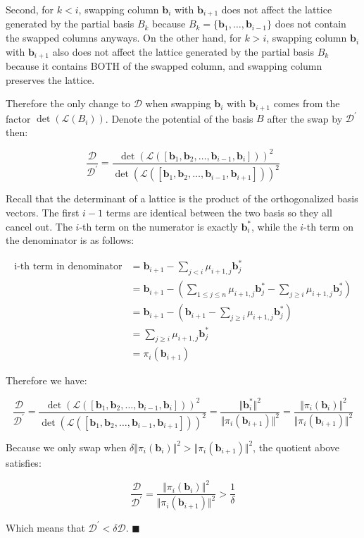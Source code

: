 Second, for $k < i$, swapping column $\mathbf{b}_i$ with $\mathbf{b}_{i+1}$ does not affect the lattice generated by the partial basis $B_k$ because $B_k = \{\mathbf{b}_1, \ldots, \mathbf{b}_{i-1}\}$ does not contain the swapped columns anyways. On the other hand, for $k > i$, swapping column $\mathbf{b}_i$ with $\mathbf{b}_{i+1}$ also does not affect the lattice generated by the partial basis $B_k$ because it contains BOTH of the swapped column, and swapping column preserves the lattice.

Therefore the only change to $\mathcal{D}$ when swapping $\mathbf{b}_i$ with $\mathbf{b}_{i+1}$ comes from the factor $\det(\mathcal{L}(B_i))$. Denote the potential of the basis $B$ after the swap by $\mathcal{D}^\prime$ then:

$$
\frac{\mathcal{D}}{\mathcal{D}^\prime} = \frac{
    \det(\mathcal{L}([\mathbf{b}_1, \mathbf{b}_2, \ldots, \mathbf{b}_{i-1}, \mathbf{b}_{i}]))^2
}{
    \det(\mathcal{L}([\mathbf{b}_1, \mathbf{b}_2, \ldots, \mathbf{b}_{i-1}, \mathbf{b}_{i+1}]))^2
}
$$

Recall that the determinant of a lattice is the product of the orthogonalized basis vectors. The first $i-1$ terms are identical between the two basis so they all cancel out. The $i$-th term on the numerator is exactly $\mathbf{b}_i^\ast$, while the $i$-th term on the denominator is as follows:

$$
\begin{aligned}
\text{i-th term in denominator} &= \mathbf{b}_{i+1} - \sum_{j < i} \mu_{i+1, j}\mathbf{b}_j^\ast \\
&= \mathbf{b}_{i+1} - (\sum_{1 \leq j \leq n} \mu_{i+1, j}\mathbf{b}_j^\ast  - \sum_{j \geq i} \mu_{i+1, j}\mathbf{b}_j^\ast) \\
&= \mathbf{b}_{i+1} - (\mathbf{b}_{i+1}  - \sum_{j \geq i} \mu_{i+1, j}\mathbf{b}_j^\ast) \\
&= \sum_{j \geq i} \mu_{i+1, j}\mathbf{b}_j^\ast \\
&= \pi_i(\mathbf{b}_{i+1})
\end{aligned}
$$

Therefore we have:

$$
\frac{\mathcal{D}}{\mathcal{D}^\prime} = \frac{
    \det(\mathcal{L}([\mathbf{b}_1, \mathbf{b}_2, \ldots, \mathbf{b}_{i-1}, \mathbf{b}_{i}]))^2
}{
    \det(\mathcal{L}([\mathbf{b}_1, \mathbf{b}_2, \ldots, \mathbf{b}_{i-1}, \mathbf{b}_{i+1}]))^2
} = \frac{\Vert\mathbf{b}_i^\ast\Vert^2}{\Vert\pi_i(\mathbf{b}_{i+1})\Vert^2}
= \frac{\Vert\pi_i(\mathbf{b}_{i})\Vert^2}{\Vert\pi_i(\mathbf{b}_{i+1})\Vert^2}
$$

Because we only swap when $\delta \Vert \pi_i(\mathbf{b}_i) \Vert^2 > \Vert \pi_i(\mathbf{b}_{i+1}) \Vert^2$, the quotient above satisfies:

$$
\frac{\mathcal{D}}{\mathcal{D}^\prime} 
= \frac{\Vert\pi_i(\mathbf{b}_{i})\Vert^2}{\Vert\pi_i(\mathbf{b}_{i+1})\Vert^2}
> \frac{1}{\delta}
$$

Which means that $\mathcal{D}^\prime < \delta \mathcal{D}$. $\blacksquare$
